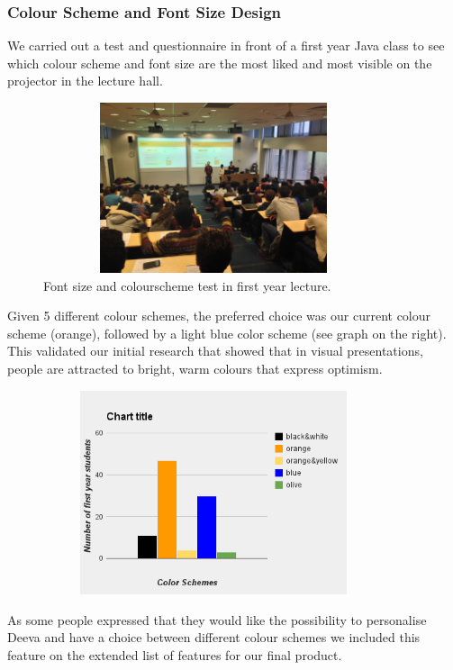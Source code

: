 \documentclass[11pt, a4paper]{article}
\begin{document}
\subsubsection{Colour Scheme and Font Size Design}
We carried out a test and questionnaire in front of a first year Java class to see which colour scheme and font size are the most liked and most visible on the projector in the lecture hall.

\begin{figure}[h!]
\centering
\includegraphics[height=50mm,width=100mm]{lectureHall.jpg}
\caption{Font size and colourscheme test in first year lecture.}
\end{figure}

Given 5 different colour schemes, the preferred choice was our current colour scheme (orange), followed by a light blue color scheme (see graph on the right).
This validated our initial research that showed that in visual presentations, people are attracted to bright, warm colours that express optimism.
\begin{figure}[h!]
\centering
\includegraphics[height=60mm,width=100mm]{colours.png}
\end{figure}

As some people expressed that they would like the possibility to personalise Deeva and have a choice between different colour schemes we included this feature on the extended list of features for our final product.
\end{document}

